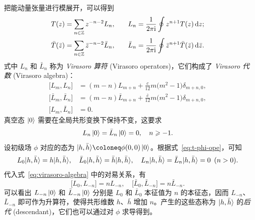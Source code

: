 把能动量张量进行模展开，可以得到
\begin{equation}
  \begin{aligned}
    T(z)             &= \sum_{n\in\mathbb{Z}} z^{-n-2} L_n, &\quad
    L_n              &= \frac{1}{2\pi\mathrm{i}} \oint z^{n+1} T(z) \, \mathrm{d} z; \\
    \bar{T}(\bar{z}) &= \sum_{n\in\mathbb{Z}} \bar{z}^{-n-2} \bar{L}_n, &\quad
    \bar{L}_n        &= \frac{1}{2\pi\mathrm{i}} \oint \bar{z}^{n+1} \bar{T}(\bar{z}) \, \mathrm{d}\bar{z}.
  \end{aligned}
  \label{eq:virasoro-operators}
\end{equation}
式中 $L_n$ 和 $\bar{L}_n$ 称为 \emph{Virasoro 算符} (Virasoro operators)，它们构成了 \emph{Virasoro 代数} (Virasoro algebra)：
\begin{equation}
  \begin{aligned}
    \bigl[ L_m, L_n \bigr]
      &= (m-n) L_{m+n} + \frac{c}{12} m \bigl( m^2-1 \bigr) \delta_{m+n,0}, \\
    \bigl[ \bar{L}_m, \bar{L}_n \bigr]
      &= (m-n) \bar{L}_{m+n} + \frac{\bar{c}}{12} m \bigl( m^2-1 \bigr) \delta_{m+n,0}, \\
    \bigl[ L_m, \bar{L}_n \bigr] &= 0.
  \end{aligned}
  \label{eq:virasoro-algebra}
\end{equation}
真空态 $\ket{0}$ 需要在全局共形变换下保持不变，这要求
\begin{equation}
  L_n \ket{0} = \bar{L}_n \ket{0} = 0, \quad n \geqslant -1.
\end{equation}
设初级场 $\phi$ 对应的态为 $\ket*{h,\bar{h}}\coloneq\phi(0,0)\ket{0}$。根据式~\eqref{eq:t-phi-ope}，可知
\begin{equation}
  L_0       \ket*{h,\bar{h}} = h       \ket*{h,\bar{h}}, \quad
  \bar{L}_0 \ket*{h,\bar{h}} = \bar{h} \ket*{h,\bar{h}}, \quad
  L_n \ket*{h,\bar{h}} = \bar{L}_n \ket*{h,\bar{h}} = 0 \enspace (n > 0).
\end{equation}
代入式~\eqref{eq:virasoro-algebra} 中的对易关系，有
\begin{equation}
  \bigl[ L_0, L_{-n} \bigr] = n L_{-n}, \quad
  \bigl[ \bar{L}_0, \bar{L}_{-n} \bigr] = n \bar{L}_{-n}.
\end{equation}
可以看出 $L_{-n}\ket{0}$ 和 $\bar{L}_{-n}\ket{0}$ 分别是 $L_0$ 和 $\bar{L}_0$ 本征值为 $n$ 的本征态，因而 $L_{-n}$、$\bar{L}_{-n}$ 即可作为升算符，使得共形维数 $h$、$\bar{h}$ 增加 $n$。产生的这些态称为 $\ket*{h,\bar{h}}$ 的\emph{后代} (descendant)，它们也可以通过对 $\phi$ 求导得到。

